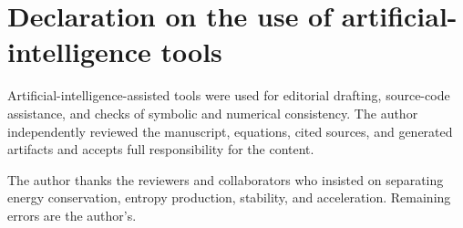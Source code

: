 \documentclass[aps,prd,reprint,superscriptaddress,nofootinbib,floatfix]{revtex4-2}
\begin{document}
\section*{Declaration on the use of artificial-intelligence tools}

Artificial-intelligence-assisted tools were used for editorial drafting,
source-code assistance, and checks of symbolic and numerical consistency.
The author independently reviewed the manuscript, equations, cited sources,
and generated artifacts and accepts full responsibility for the content.

\begin{acknowledgments}
The author thanks the reviewers and collaborators who insisted on separating
energy conservation, entropy production, stability, and acceleration.
Remaining errors are the author's.
\end{acknowledgments}


\end{document}
